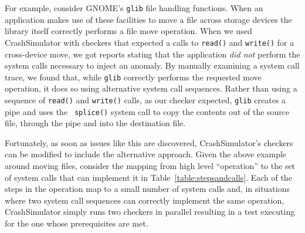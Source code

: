 For example, consider GNOME's {\tt glib} file handling functions.  When an
application makes use of these facilities to move a file across storage
devices the library itself correctly performs a
file move operation.  When we used CrashSimulator with
checkers that expected a calls to {\tt read()} and {\tt write()}
for a cross-device move, we got reports stating that the
application {\em did not} perform the system calls necessary to inject
an anomaly.  By manually
examining a system call trace, we found that, while {\tt glib} correctly
performs the requested move operation,
it does so using alternative system call
sequences.  Rather than using a sequence of {\tt read()} and {\tt write()}
calls, as our checker expected, {\tt glib} creates a pipe and uses the {\tt
splice()} system call to copy the contents out of the source file, through
the pipe and into the destination file.

Fortunately, as soon as issues like this are discovered,
CrashSimulator's checkers can be modified to include the alternative
approach.
Given the above example around moving
files, consider the mapping from high level ``operation'' to the set of
system calls that can implement it in Table~\ref{table:stepsandcalls}.
Each of the steps in the operation map to a small number of system calls
and,
in
situations where two system call sequences can correctly implement the same
operation, CrashSimulator simply runs two checkers in parallel resulting in a
test executing for the one whose prerequisites are met.


